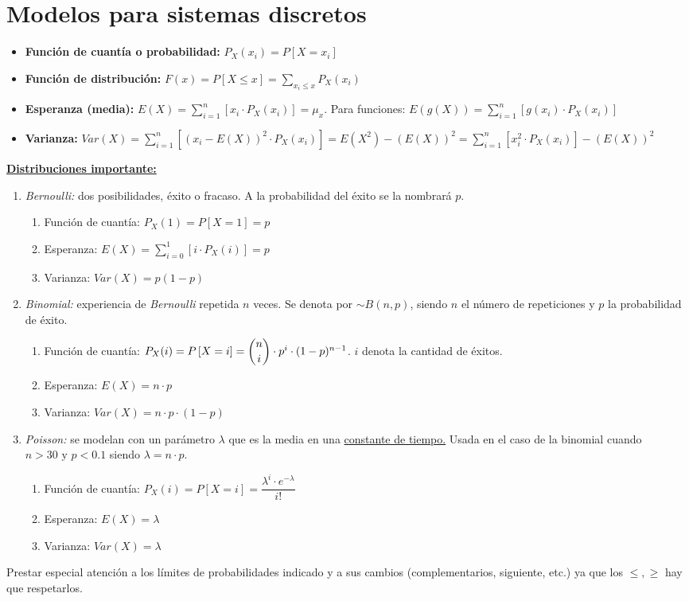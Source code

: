 \documentclass[a4paper, twocolumn, 10pt]{article}
\begin{document}
\section{Modelos para sistemas discretos}

\begin{itemize}
	\item \textbf{Función de cuantía o probabilidad:} $P_X(x_i) = P\left[X = x_i\right]$
	\item \textbf{Función de distribución:} $F(x) = P\left[X\leq x\right] = \sum\limits_{x_i \leq x} P_X(x_i)$
	\item \textbf{Esperanza (media):} $E(X) = \sum\limits_{i=1}^n\left[x_i \cdot P_X(x_i)\right] = \mu_x$. Para funciones: $E(g(X)) = \sum\limits_{i=1}^n\left[g(x_i) \cdot P_X(x_i)\right]$
	\item \textbf{Varianza:} $Var(X) = \sum\limits_{i=1}^n\left[\left(x_i - E(X)\right)^2\cdot P_X(x_i)\right] = E(X^2) - (E(X))^2 = \sum\limits_{i=1}^n\left[x_i^2\cdot P_X(x_i)\right] - (E(X))^2$
\end{itemize}
	\underline{\textbf{Distribuciones importante:}}
	\begin{enumerate}
		\item \textit{Bernoulli:} dos posibilidades, éxito o fracaso. A la probabilidad del éxito se la nombrará $p$.
		\begin{enumerate}
			\item Función de cuantía: $P_X(1) = P\left[X=1\right] = p$
			\item Esperanza: $E(X) = \sum\limits_{i=0}^1\left[i\cdot P_X(i)\right] = p$
			\item Varianza: $Var(X) = p(1-p)$
		\end{enumerate}
		\item \textit{Binomial:} experiencia de \textit{Bernoulli} repetida $n$ veces. Se denota por $\sim B(n, p)$, siendo $n$ el número de repeticiones y $p$ la probabilidad de éxito.
		\begin{enumerate}
			\item Función de cuantía: $P_X(i) = P\left[X=i\right] = \dbinom{n}{i}\cdot p^i\cdot (1-p)^{n-1}$. $i$ denota la cantidad de éxitos.
			\item Esperanza: $E(X) = n\cdot p$
			\item Varianza: $Var(X) = n\cdot p\cdot (1-p)$
		\end{enumerate}
		\item \textit{Poisson:} se modelan con un parámetro $\lambda$ que es la media en una \underline{constante de tiempo.} Usada en el caso de la binomial cuando $n > 30 \text{ y } p < 0.1$ siendo $\lambda = n\cdot p$.
		\begin{enumerate}
			\item Función de cuantía: $P_X(i) = P\left[X = i\right] = \dfrac{\lambda^i\cdot e^{-\lambda}}{i!}$
			\item Esperanza: $E(X) = \lambda$
			\item Varianza: $Var(X) = \lambda$
		\end{enumerate}
	\end{enumerate}
Prestar especial atención a los límites de probabilidades indicado y a sus cambios (complementarios, siguiente, etc.) ya que los $\leq, \geq$ hay que respetarlos.
\end{document}
